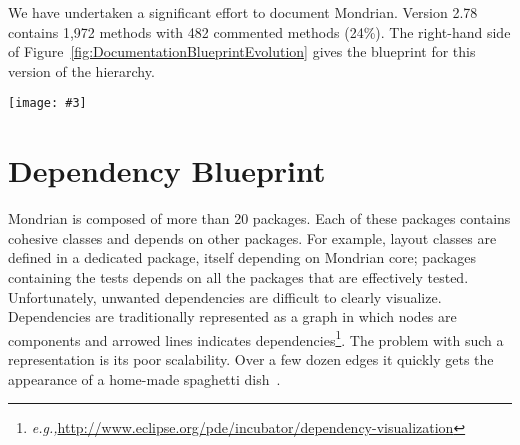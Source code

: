 \documentclass[runningheads]{llncs}
\newcommand{\ct}{\lstinline[backgroundcolor=\color{white},basicstyle=\footnotesize\ttfamily]}
\newcommand{\largefig}[4]{
	\begin{figure*}[#1]
		\centering
		\texttt{[image: \#3]}
		\caption{\label{fig:#3}#4}
	\end{figure*}}
\newcommand{\eg}{\emph{e.g.,}\xspace}
\newcommand{\seclabel}[1]{\label{sec:#1}}
\newcommand{\figref}[1]{Figure~\ref{fig:#1}}
\newcommand{\tablabel}[1]{\label{tab:#1}}
\begin{document}
We have undertaken a significant effort to document Mondrian. Version 2.78 contains 1,972 methods with 482 commented methods (24\%). The right-hand side of \figref{DocumentationBlueprintEvolution} gives the blueprint for this version of the hierarchy.


%
%

\largefig{}{1.0}{DocumentationBlueprintEvolution}{Documentation of the \ct{MOShape} class hierarchy.}

\section{Dependency Blueprint}\seclabel{dependencyblueprint}

Mondrian is composed of more than 20 packages. Each of these packages contains cohesive classes and depends on other packages. For example, layout classes are defined in a dedicated package, itself depending on Mondrian core; packages containing the tests depends on all the packages that are effectively tested. Unfortunately, unwanted dependencies are difficult to clearly visualize.
Dependencies are traditionally represented as a graph in which nodes are components and arrowed lines indicates dependencies\footnote{\eg \url{http://www.eclipse.org/pde/incubator/dependency-visualization}}. The problem with such a representation is its poor scalability. Over a few dozen edges it quickly gets the appearance of a home-made spaghetti dish~\cite{Tele10a}. 
\end{document}
